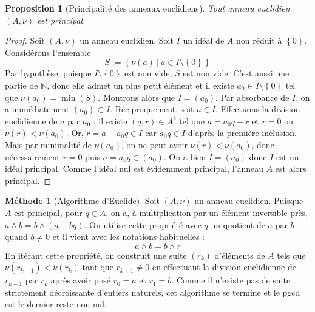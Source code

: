 \documentclass[french]{book}
\newcommand{\N}{\mathbb{N}}
\theoremstyle{plain}
\newtheorem{prop}{Proposition}[chapter]
\theoremstyle{definition}
\newtheorem{met}{Méthode}[chapter]
\theoremstyle{remark}
\begin{document}
\begin{prop}[Principalité des anneaux euclidiens]
	Tout anneau euclidien $(A,\nu)$ est principal.
\end{prop}
\begin{proof}
	Soit $(A,\nu)$ un anneau euclidien. Soit $I$ un idéal de $A$ non réduit à $\left\{0\right\}$. Considérons l'ensemble $$S:=\left\{\nu(a)\ | \ a\in I\setminus\left\{0\right\}\right\}$$ Par hypothèse, puisque $I\setminus\left\{0\right\}$ est non vide, $S$ est non vide. C'est aussi une partie de $\N$, donc elle admet un plus petit élément et il existe $a_0\in I\setminus\left\{0\right\}$ tel que $\nu(a_0)=\min(S)$. Montrons alors que $I=(a_0)$. Par absorbance de $I$, on a immédiatement $(a_0)\subset I$. Réciproquement, soit $a\in I$. Effectuons la division euclidienne de $a$ par $a_0$ : il existe $(q,r)\in A^2$ tel que $a=a_0q+r$ et $r=0$ ou $\nu(r)<\nu(a_0)$. Or, $r=a-a_0q\in I$ car $a_0q\in I$ d'après la première inclusion. Mais par minimalité de $\nu(a_0)$, on ne peut avoir $\nu(r)<\nu(a_0)$, donc nécessairement $r=0$ puis $a=a_0q\in(a_0)$. On a bien $I=(a_0)$ donc $I$ est un idéal principal. Comme l'idéal nul est évidemment principal, l'anneau $A$ est alors principal.
\end{proof}
\begin{met}[Algorithme d'Euclide]
	Soit $(A,\nu)$ un anneau euclidien. Puisque $A$ est principal, pour $q\in A$, on a, à multiplication par un élément inversible près, $a\wedge b=b\wedge(a-bq)$. On utilise cette propriété avec $q$ un quotient de $a$ par $b$ quand $b\ne0$ et il vient avec les notations habituelles : $$a\wedge b=b\wedge r$$ En itérant cette propriété, on construit une suite $(r_k)$ d'éléments de $A$ tels que $\nu(r_{k+1})<\nu(r_k)$ tant que $r_{k+1}\ne0$ en effectuant la division euclidienne de $r_{k-1}$ par $r_k$ après avoir posé $r_0=a$ et $r_1=b$. Comme il n'existe pas de suite strictement décroissante d'entiers naturels, cet algorithme se termine et le pgcd est le dernier reste non nul.
\end{met}
\end{document}
